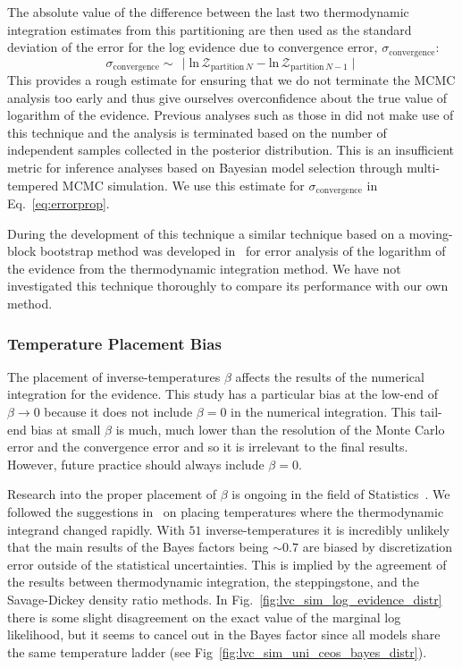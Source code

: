The absolute value of the difference between the last two thermodynamic integration estimates from this partitioning are then used as the standard deviation of the error for the log evidence due to convergence error, $\sigma_{\mathrm{convergence}}$:
\begin{equation}
    \sigma_{\mathrm{convergence}} \sim  \, \mid \mathrm{ln} \, \mathcal{Z}_{\mathrm{partition \,} N} - \mathrm{ln} \, \mathcal{Z}_{\mathrm{partition \,} N-1} \mid
\end{equation}
This provides a rough estimate for ensuring that we do not terminate the MCMC analysis too early and thus give ourselves overconfidence about the true value of logarithm of the evidence. Previous analyses such as those in \cite{de2018tidal} did not make use of this technique and the analysis is terminated based on the number of independent samples collected in the posterior distribution. This is an insufficient metric for inference analyses based on Bayesian model selection through multi-tempered MCMC simulation. We use this estimate for $\sigma_{\mathrm{convergence}}$ in Eq.~\ref{eq:errorprop}.

During the development of this technique a similar technique based on a moving-block bootstrap method was developed in~\cite{Russel:2018pqv} for error analysis of the logarithm of the evidence from the thermodynamic integration method. We have not investigated this technique thoroughly to compare its performance with our own method.

\subsubsection{Temperature Placement Bias}
The placement of inverse-temperatures $\beta$ affects the results of the numerical integration for the evidence\citep{lartillot2006computing, xie2010improving}. This study has a particular bias at the low-end of $\beta \to 0$ because it does not include $\beta = 0$ in the numerical integration. This tail-end bias at small $\beta$ is much, much lower than the resolution of the Monte Carlo error and the convergence error and so it is irrelevant to the final results. However, future practice should always include $\beta =0$.

Research into the proper placement of $\beta$ is ongoing in the field of Statistics~\citep{annis2019thermodynamic}. We followed the suggestions in~\cite{liu2016evaluating} on placing temperatures where the thermodynamic integrand changed rapidly. With $51$ inverse-temperatures it is incredibly unlikely that the main results of the Bayes factors being $\sim 0.7$ are biased by discretization error outside of the statistical uncertainties. This is implied by the agreement of the results between thermodynamic integration, the steppingstone, and the Savage-Dickey density ratio methods. In Fig.~\ref{fig:lvc_sim_log_evidence_distr} there is some slight disagreement on the exact value of the marginal log likelihood, but it seems to cancel out in the Bayes factor since all models share the same temperature ladder (see Fig~\ref{fig:lvc_sim_uni_ceos_bayes_distr}).

